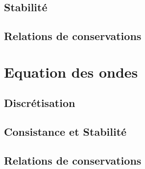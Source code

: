 \subsection{Stabilité}

\subsection{Relations de conservations}




\section{Equation des ondes}

\subsection{Discrétisation}

\subsection{Consistance et Stabilité}

\subsection{Relations de conservations}